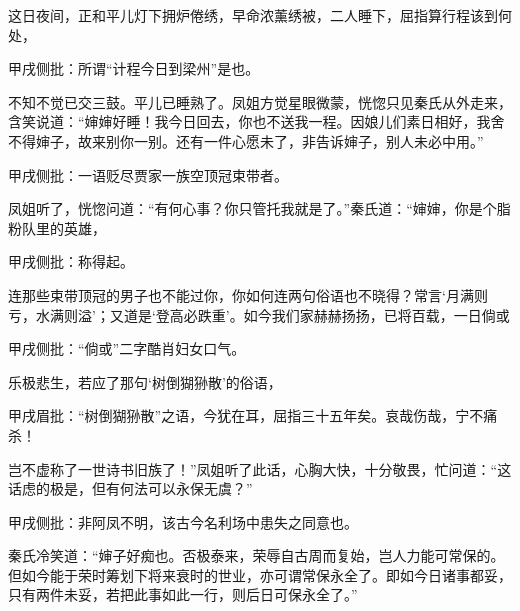 \begin{parag}
    这日夜间，正和平儿灯下拥炉倦绣，早命浓薰绣被，二人睡下，屈指算行程该到何处，\begin{note}甲戌侧批：所谓“计程今日到梁州”是也。\end{note}不知不觉已交三鼓。平儿已睡熟了。凤姐方觉星眼微蒙，恍惚只见秦氏从外走来，含笑说道：“婶婶好睡！我今日回去，你也不送我一程。因娘儿们素日相好，我舍不得婶子，故来别你一别。还有一件心愿未了，非告诉婶子，别人未必中用。”\begin{note}甲戌侧批：一语贬尽贾家一族空顶冠束带者。\end{note}
\end{parag}


\begin{parag}
    凤姐听了，恍惚问道：“有何心事？你只管托我就是了。”秦氏道：“婶婶，你是个脂粉队里的英雄，\begin{note}甲戌侧批：称得起。\end{note}连那些束带顶冠的男子也不能过你，你如何连两句俗语也不晓得？常言‘月满则亏，水满则溢’；又道是‘登高必跌重’。如今我们家赫赫扬扬，已将百载，一日倘或\begin{note}甲戌侧批：“倘或”二字酷肖妇女口气。\end{note}乐极悲生，若应了那句‘树倒猢狲散’的俗语，\begin{note}甲戌眉批：“树倒猢狲散”之语，今犹在耳，屈指三十五年矣。哀哉伤哉，宁不痛杀！\end{note}岂不虚称了一世诗书旧族了！”凤姐听了此话，心胸大快，十分敬畏，忙问道：“这话虑的极是，但有何法可以永保无虞？”\begin{note}甲戌侧批：非阿凤不明，该古今名利场中患失之同意也。\end{note}秦氏冷笑道：“婶子好痴也。否极泰来，荣辱自古周而复始，岂人力能可常保的。但如今能于荣时筹划下将来衰时的世业，亦可谓常保永全了。即如今日诸事都妥，只有两件未妥，若把此事如此一行，则后日可保永全了。”
\end{parag}


